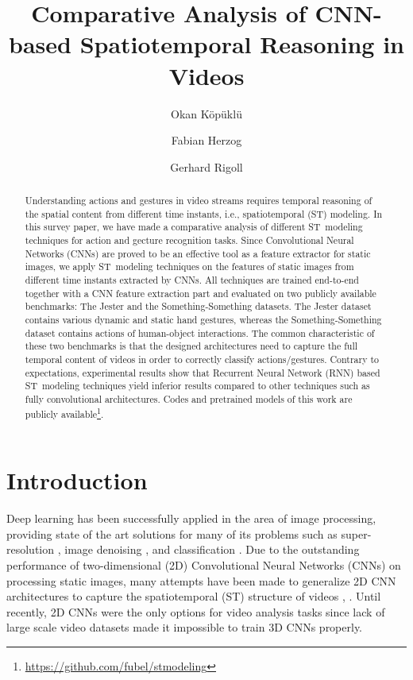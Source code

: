 \documentclass[runningheads]{llncs}
\begin{document}
\title{Comparative Analysis of CNN-based Spatiotemporal Reasoning in Videos}


\author{Okan K\"op\"ukl\"u \and Fabian Herzog \and Gerhard Rigoll}



\maketitle           
\begin{abstract}
Understanding actions and gestures in video streams requires temporal reasoning of the spatial content from different time instants, i.e., spatiotemporal (ST) modeling. In this survey paper, we have made a comparative analysis of different ST~modeling techniques for action and gecture recognition tasks. Since Convolutional Neural Networks (CNNs) are proved to be an effective tool as a feature extractor for static images, we apply ST~modeling techniques on the features of static images from different time instants extracted by CNNs. All techniques are trained end-to-end together with a CNN feature extraction part and evaluated on two publicly available benchmarks: The Jester and the Something-Something datasets. The Jester dataset contains various dynamic and static hand gestures, whereas the Something-Something dataset contains actions of human-object interactions. The common characteristic of these two benchmarks is that the designed architectures need to capture the full temporal content of videos in order to correctly classify actions/gestures. Contrary to expectations, experimental results show that Recurrent Neural Network (RNN) based ST~modeling techniques yield inferior results compared to other techniques such as fully convolutional architectures. Codes and pretrained models of this work are publicly available\footnote{\url{https://github.com/fubel/stmodeling}}.  

\end{abstract}


%
 \section{Introduction}

Deep learning has been successfully applied in the area of image processing, providing state of the art solutions for many of its problems such as super-resolution \cite{ledig2017photo}, image denoising \cite{Liu_2018_CVPR_Workshops}, and classification \cite{deng2009imagenet}. Due to the outstanding performance of two-dimensional (2D) Convolutional Neural Networks (CNNs) on processing static images,  many attempts have been made to generalize 2D CNN architectures to capture the spatiotemporal (ST) structure of videos \cite{Simonyan2014-vh}, \cite{Wang2016-gj}. Until recently, 2D CNNs were the only options for video analysis tasks since lack of large scale video datasets made it impossible to train 3D CNNs properly.
\end{document}
